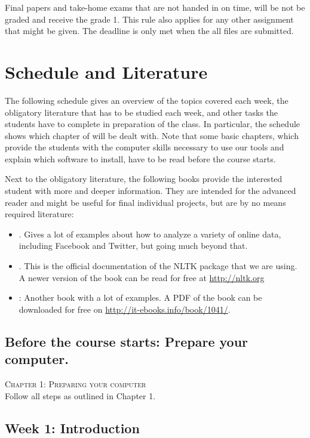 \documentclass[a4paper,10pt]{report}
\begin{document}
Final papers and take-home exams that are not handed in on time, will be not be graded and receive the grade 1. This rule also applies for any other assignment that might be given. The deadline is only met when the all files are submitted.

\chapter{Schedule and Literature}

The following schedule gives an overview of the topics covered each week, the obligatory literature that has to be studied each week, and other tasks the students have to complete in preparation of the class.
In particular, the schedule shows which chapter of \cite{Trilling2016} will be dealt with. Note that some basic chapters, which provide the students with the computer skills necessary to use our tools and explain which software to install, have to be read before the course starts.

Next to the obligatory literature, the following books provide the interested student with more and deeper information. They are intended for the advanced reader and might be useful for final individual projects, but are by no means required literature:

\begin{itemize}
\item \citealp{Russel2013}. Gives a lot of examples about how to analyze a variety of online data, including Facebook and Twitter, but going much beyond that.
\item \citealp{Bird2009}. This is the official documentation of the NLTK package that we are using. A newer version of the book can be read for free at \url{http://nltk.org}
\item \citealp{McKinney2012}: Another book with a lot of examples. A PDF of the book can be downloaded for free on \url{http://it-ebooks.info/book/1041/}.
\end{itemize}


\section*{Before the course starts: Prepare your computer.}
\textsc{ Chapter 1: Preparing your computer}\\
Follow all steps as outlined in Chapter 1.

\section*{Week 1: Introduction}
\end{document}
